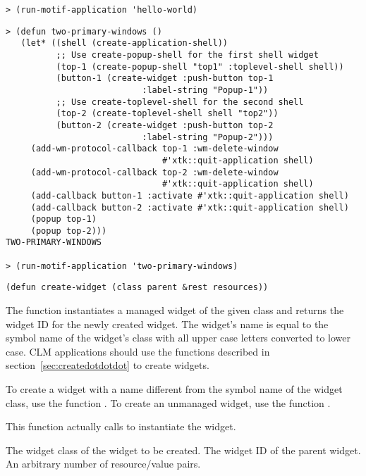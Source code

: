 \begin{lispd}
\begin{verbatim}
> (run-motif-application 'hello-world)
\end{verbatim}
\beispiel\begin{verbatim}
> (defun two-primary-windows ()
   (let* ((shell (create-application-shell))
          ;; Use create-popup-shell for the first shell widget
          (top-1 (create-popup-shell "top1" :toplevel-shell shell))
          (button-1 (create-widget :push-button top-1
		                   :label-string "Popup-1"))
          ;; Use create-toplevel-shell for the second shell
          (top-2 (create-toplevel-shell shell "top2"))
          (button-2 (create-widget :push-button top-2
		                   :label-string "Popup-2")))
     (add-wm-protocol-callback top-1 :wm-delete-window
                               #'xtk::quit-application shell)
     (add-wm-protocol-callback top-2 :wm-delete-window
                               #'xtk::quit-application shell)
     (add-callback button-1 :activate #'xtk::quit-application shell)
     (add-callback button-2 :activate #'xtk::quit-application shell)
     (popup top-1)
     (popup top-2)))
TWO-PRIMARY-WINDOWS

> (run-motif-application 'two-primary-windows)

\end{verbatim}
\end{lispd}

\begin{lispd}
\syntax\begin{verbatim}
(defun create-widget (class parent &rest resources))
\end{verbatim}
\beschr The function instantiates a managed widget of the given class and
returns the widget ID for the newly created widget.  The widget's name is equal
to the symbol name of the widget's class with all upper case letters converted
to lower case. 
\hinweis CLM applications should use the  functions described
in section~\ref{sec:createdotdotdot} to create widgets.

To create a widget with a name different from the symbol name of the
widget class, use the function .
To create an unmanaged widget, use the function .

This function actually calls  to instantiate the
widget.
\parameter
\begin{paramd}
 The widget class of the widget to be created.
 The widget ID of the parent widget.
 An arbitrary number of resource/value pairs.
\end{paramd}
\end{lispd}

